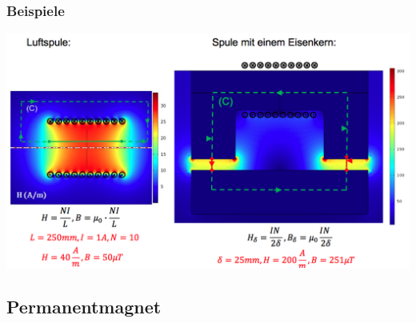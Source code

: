 \subsubsection{Beispiele}
\includegraphics[width = \linewidth]{./Pics/VL2/magKreisBeispiele}

\subsection{Permanentmagnet}

